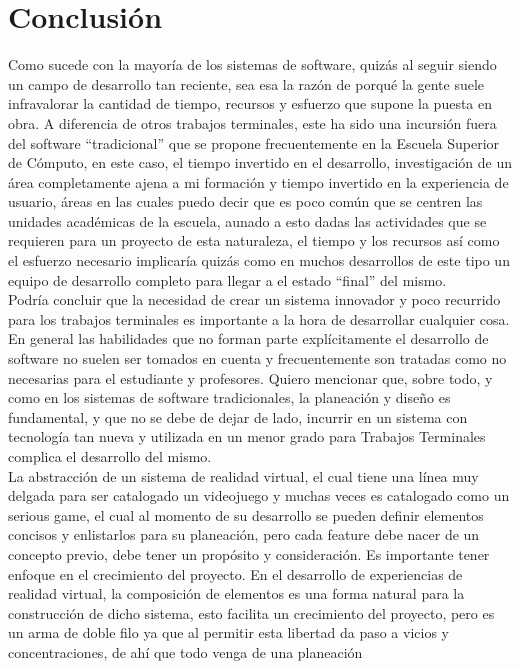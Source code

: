 \section{Conclusión}
Como sucede con la mayoría de los sistemas de software, quizás al seguir siendo un campo de desarrollo tan reciente, sea esa la razón de porqué 
la gente suele infravalorar la cantidad de tiempo, recursos y esfuerzo que supone la puesta en obra. A diferencia de otros trabajos terminales, 
este ha sido una incursión fuera del software “tradicional” que se propone frecuentemente en la Escuela Superior de Cómputo, en este caso, 
el tiempo invertido en el desarrollo, investigación de un área completamente ajena a mi formación y tiempo invertido en la experiencia de usuario, 
áreas en las cuales puedo decir que es poco común que se centren las unidades académicas de la escuela, aunado a esto dadas las actividades que se 
requieren para un proyecto de esta naturaleza, el tiempo y los recursos así como el esfuerzo necesario implicaría quizás como en muchos desarrollos 
de este tipo un equipo de desarrollo completo para llegar a el estado “final” del mismo.\\ 
Podría concluir que la necesidad de crear un sistema innovador y poco recurrido para los trabajos terminales es importante a la hora de desarrollar cualquier cosa.\\
En general las habilidades que no forman parte explícitamente el desarrollo de software no suelen ser tomados en cuenta y frecuentemente son tratadas 
como no necesarias para el estudiante y profesores. Quiero mencionar que, sobre todo, y como en los sistemas de software tradicionales, la planeación 
y diseño es fundamental, y que no se debe de dejar de lado, incurrir en un sistema con tecnología tan nueva y utilizada en un menor grado para Trabajos 
Terminales complica el desarrollo del mismo.\\
La abstracción de un sistema de realidad virtual, el cual tiene una línea muy delgada para ser catalogado un videojuego y muchas veces es catalogado 
como un serious game, el cual al momento de su desarrollo se pueden definir elementos concisos y enlistarlos para su planeación, pero cada feature debe 
nacer de un concepto previo, debe tener un propósito y consideración. Es importante tener enfoque en el crecimiento del proyecto. En el desarrollo de 
experiencias de realidad virtual, la composición de elementos es una forma natural para la construcción de dicho sistema, esto facilita un crecimiento 
del proyecto, pero es un arma de doble filo ya que al permitir esta libertad da paso a vicios y concentraciones, de ahí que todo venga de una planeación 
